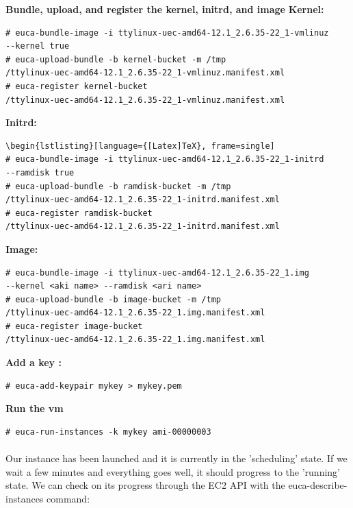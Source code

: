 \textbf{Bundle, upload, and register the kernel, initrd, and image}
\newline
\textbf{Kernel:}
\begin{lstlisting}[language={[Latex]TeX}, frame=single]
# euca-bundle-image -i ttylinux-uec-amd64-12.1_2.6.35-22_1-vmlinuz 
--kernel true
# euca-upload-bundle -b kernel-bucket -m /tmp
/ttylinux-uec-amd64-12.1_2.6.35-22_1-vmlinuz.manifest.xml
# euca-register kernel-bucket
/ttylinux-uec-amd64-12.1_2.6.35-22_1-vmlinuz.manifest.xml
\end{lstlisting}
\textbf{Initrd:}
\begin{lstlisting}[language={[Latex]TeX}, frame=single]
\begin{lstlisting}[language={[Latex]TeX}, frame=single]
# euca-bundle-image -i ttylinux-uec-amd64-12.1_2.6.35-22_1-initrd 
--ramdisk true
# euca-upload-bundle -b ramdisk-bucket -m /tmp
/ttylinux-uec-amd64-12.1_2.6.35-22_1-initrd.manifest.xml
# euca-register ramdisk-bucket
/ttylinux-uec-amd64-12.1_2.6.35-22_1-initrd.manifest.xml
\end{lstlisting}

\newpage

\textbf{Image:}
\begin{lstlisting}[language={[Latex]TeX}, frame=single]
# euca-bundle-image -i ttylinux-uec-amd64-12.1_2.6.35-22_1.img 
--kernel <aki name> --ramdisk <ari name>
# euca-upload-bundle -b image-bucket -m /tmp
/ttylinux-uec-amd64-12.1_2.6.35-22_1.img.manifest.xml
# euca-register image-bucket
/ttylinux-uec-amd64-12.1_2.6.35-22_1.img.manifest.xml
\end{lstlisting}

\textbf{Add a key :}

\begin{lstlisting}[language={[Latex]TeX}, frame=single]
# euca-add-keypair mykey > mykey.pem
\end{lstlisting}

\textbf{Run the vm }

\begin{lstlisting}[language={[Latex]TeX}, frame=single]
# euca-run-instances -k mykey ami-00000003
\end{lstlisting}

\paragraph{}Our instance has been launched and it is currently in the 'scheduling' state. 
If we wait a few minutes and everything goes well, it should progress to the 'running' state.
 We can check on its progress through the EC2 API with the euca-describe-instances command:

